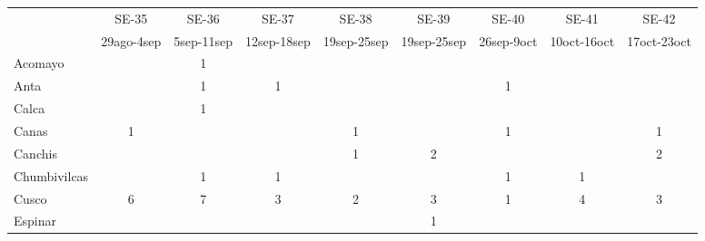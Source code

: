 \begin{tabular}{lcccccccc}
	\textbf{}     & SE-35                    & SE-36                    & SE-37                    & SE-38                    & SE-39                    & SE-40                    & SE-41                    & SE-42                    \\
	\textbf{}     & 29ago-4sep               & 5sep-11sep               & 12sep-18sep              & 19sep-25sep              & 19sep-25sep              & 26sep-9oct               & 10oct-16oct              & 17oct-23oct              \\
	Acomayo       & \cellcolor[HTML]{FCC46C} & 1                        & \cellcolor[HTML]{FCC46C} & \cellcolor[HTML]{FCC46C} & \cellcolor[HTML]{FCC46C} & \cellcolor[HTML]{FCC46C} & \cellcolor[HTML]{FCC46C} & \cellcolor[HTML]{FCC46C} \\
	Anta          & \cellcolor[HTML]{FCC46C} & 1                        & 1                        & \cellcolor[HTML]{FCC46C} & \cellcolor[HTML]{FCC46C} & 1                        & \cellcolor[HTML]{FCC46C} & \cellcolor[HTML]{FCC46C} \\
	Calca         & \cellcolor[HTML]{FCC46C} & 1                        & \cellcolor[HTML]{FCC46C} & \cellcolor[HTML]{FCC46C} & \cellcolor[HTML]{FCC46C} & \cellcolor[HTML]{FCC46C} & \cellcolor[HTML]{FCC46C} & \cellcolor[HTML]{FCC46C} \\
	Canas         & 1                        & \cellcolor[HTML]{FCC46C} & \cellcolor[HTML]{FCC46C} & 1                        & \cellcolor[HTML]{FCC46C} & 1                        & \cellcolor[HTML]{FCC46C} & 1                        \\
	Canchis       &                          & \cellcolor[HTML]{FCC46C} & \cellcolor[HTML]{FCC46C} & 1                        & 2                        & \cellcolor[HTML]{FCC46C} & \cellcolor[HTML]{FCC46C} & 2                        \\
	Chumbivilcas  & \cellcolor[HTML]{FCC46C} & 1                        & 1                        & \cellcolor[HTML]{FCC46C} & \cellcolor[HTML]{FCC46C} & 1                        & 1                        & \cellcolor[HTML]{FCC46C} \\
	Cusco         & 6                        & 7                        & 3                        & 2                        & 3                        & 1                        & 4                        & 3                        \\
	Espinar       & \cellcolor[HTML]{FCC46C} & \cellcolor[HTML]{FCC46C} & \cellcolor[HTML]{FCC46C} & \cellcolor[HTML]{FCC46C} & 1                        & \cellcolor[HTML]{FCC46C} & \cellcolor[HTML]{FCC46C} & \cellcolor[HTML]{FCC46C} \\

\end{tabular}
